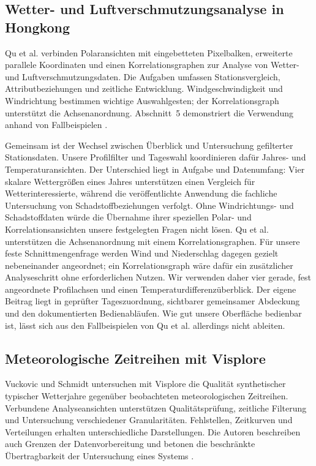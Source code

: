 \documentclass[usegeometry=true]{scrartcl}
\begin{document}
\subsection{Wetter- und Luftverschmutzungsanalyse in Hongkong}
Qu et al. verbinden Polaransichten mit eingebetteten Pixelbalken,
erweiterte parallele Koordinaten und einen Korrelationsgraphen zur Analyse
von Wetter- und Luftverschmutzungsdaten. Die Aufgaben umfassen
Stationsvergleich, Attributbeziehungen und zeitliche Entwicklung.
Windgeschwindigkeit und Windrichtung bestimmen wichtige Auswahlgesten;
der Korrelationsgraph unterstützt die Achsenanordnung. Abschnitt~5
demonstriert die Verwendung anhand von Fallbeispielen
\autocite[Abschnitte~3--5]{qu2007pollution}.

Gemeinsam ist der Wechsel zwischen Überblick und Untersuchung gefilterter
Stationsdaten. Unsere Profilfilter und Tageswahl koordinieren dafür
Jahres- und Temperaturansichten. Der Unterschied liegt in Aufgabe und
Datenumfang: Vier skalare Wettergrößen eines Jahres unterstützen einen
Vergleich für Wetterinteressierte, während die veröffentlichte Anwendung
die fachliche Untersuchung von Schadstoffbeziehungen verfolgt. Ohne
Windrichtungs- und Schadstoffdaten würde die Übernahme ihrer speziellen
Polar- und Korrelationsansichten unsere festgelegten Fragen nicht lösen.
Qu et al. unterstützen die Achsenanordnung mit einem Korrelationsgraphen.
Für unsere feste Schnittmengenfrage werden Wind und Niederschlag dagegen
gezielt nebeneinander angeordnet; ein Korrelationsgraph wäre dafür ein
zusätzlicher Analyseschritt ohne erforderlichen Nutzen.
Wir verwenden daher vier gerade, fest angeordnete Profilachsen und einen
Temperaturdifferenzüberblick. Der eigene Beitrag liegt in geprüfter
Tageszuordnung, sichtbarer gemeinsamer Abdeckung und den dokumentierten
Bedienabläufen. Wie gut unsere Oberfläche bedienbar ist, lässt sich aus den Fallbeispielen
von Qu et al. allerdings nicht ableiten.

\subsection{Meteorologische Zeitreihen mit Visplore}
Vuckovic und Schmidt untersuchen mit Visplore die Qualität synthetischer
typischer Wetterjahre gegenüber beobachteten meteorologischen Zeitreihen.
Verbundene Analyseansichten unterstützen Qualitätsprüfung, zeitliche
Filterung und Untersuchung verschiedener Granularitäten. Fehlstellen,
Zeitkurven und Verteilungen erhalten unterschiedliche Darstellungen.
Die Autoren beschreiben auch Grenzen der Datenvorbereitung und
betonen die beschränkte Übertragbarkeit der Untersuchung eines Systems
\autocite[Abschnitte~2--4 und~6]{vuckovic2020meteorological}.
\end{document}
